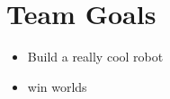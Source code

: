 

\section{Team Goals}
\begin{itemize}
    \item Build a really cool robot
    \item win worlds
\end{itemize}

